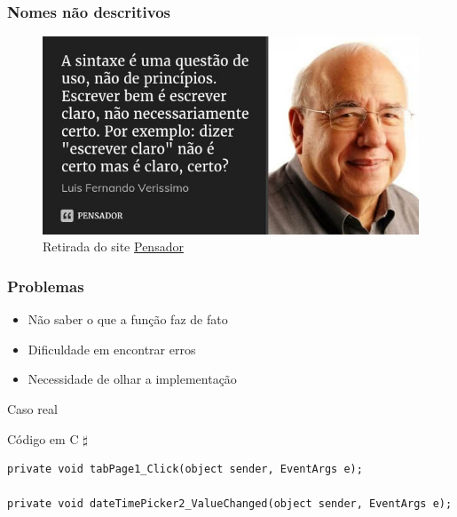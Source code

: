 \begin{frame}
	\frametitle{Nomes não descritivos}

	\begin{figure}[h]
		\centering
			\includegraphics[height=0.6\paperheight]{figuras/luis}
		\caption{Retirada do site \href{https://www.pensador.com/frase/MTU0NjQ/}{Pensador}}\label{figure:luis}
	\end{figure}

\end{frame}

\begin{frame}
	\frametitle{Problemas}
	\begin{itemize}
		\item Não saber o que a função faz de fato
		\item Dificuldade em encontrar erros
		\item Necessidade de olhar a implementação
	\end{itemize}
\end{frame}

\begin{frame}
	\Huge Caso real
\end{frame}

\begin{frame}[fragile]

	\begin{listing}[H]
		\caption{Código em C $\sharp$}
		\begin{verbatim}
private void tabPage1_Click(object sender, EventArgs e);

private void dateTimePicker2_ValueChanged(object sender, EventArgs e);
	\end{verbatim}
	\end{listing}

\end{frame}

